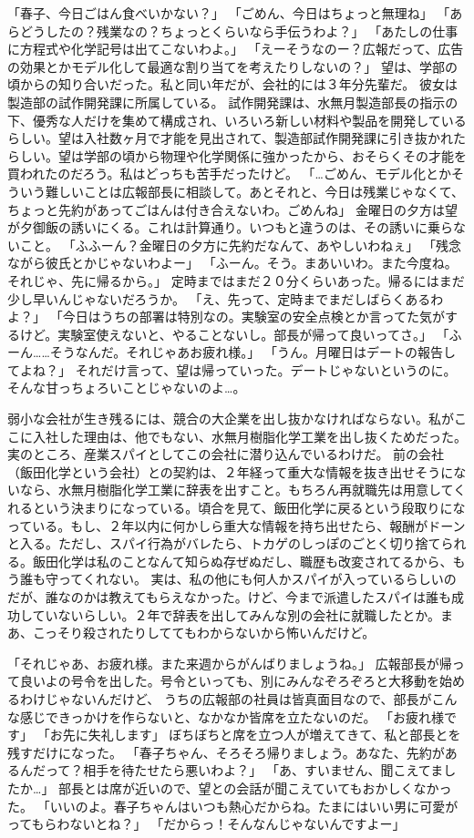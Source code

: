 「春子、今日ごはん食べいかない？」
「ごめん、今日はちょっと無理ね」
「あらどうしたの？残業なの？ちょっとくらいなら手伝うわよ？」
「あたしの仕事に方程式や化学記号は出てこないわよ。」
「えーそうなのー？広報だって、広告の効果とかモデル化して最適な割り当てを考えたりしないの？」
望は、学部の頃からの知り合いだった。私と同い年だが、会社的には３年分先輩だ。
彼女は製造部の試作開発課に所属している。
試作開発課は、水無月製造部長の指示の下、優秀な人だけを集めて構成され、いろいろ新しい材料や製品を開発しているらしい。望は入社数ヶ月で才能を見出されて、製造部試作開発課に引き抜かれたらしい。望は学部の頃から物理や化学関係に強かったから、おそらくその才能を買われたのだろう。私はどっちも苦手だったけど。
「…ごめん、モデル化とかそういう難しいことは広報部長に相談して。あとそれと、今日は残業じゃなくて、ちょっと先約があってごはんは付き合えないわ。ごめんね」
金曜日の夕方は望が夕御飯の誘いにくる。これは計算通り。いつもと違うのは、その誘いに乗らないこと。
「ふふーん？金曜日の夕方に先約だなんて、あやしいわねぇ」
「残念ながら彼氏とかじゃないわよー」
「ふーん。そう。まあいいわ。また今度ね。それじゃ、先に帰るから。」
定時まではまだ２０分くらいあった。帰るにはまだ少し早いんじゃないだろうか。
「え、先って、定時までまだしばらくあるわよ？」
「今日はうちの部署は特別なの。実験室の安全点検とか言ってた気がするけど。実験室使えないと、やることないし。部長が帰って良いってさ。」
「ふーん……そうなんだ。それじゃあお疲れ様。」
「うん。月曜日はデートの報告してよね？」
それだけ言って、望は帰っていった。デートじゃないというのに。そんな甘っちょろいことじゃないのよ…。

弱小な会社が生き残るには、競合の大企業を出し抜かなければならない。私がここに入社した理由は、他でもない、水無月樹脂化学工業を出し抜くためだった。実のところ、産業スパイとしてこの会社に潜り込んでいるわけだ。
前の会社（飯田化学という会社）との契約は、２年経って重大な情報を抜き出せそうにないなら、水無月樹脂化学工業に辞表を出すこと。もちろん再就職先は用意してくれるという決まりになっている。頃合を見て、飯田化学に戻るという段取りになっている。もし、２年以内に何かしら重大な情報を持ち出せたら、報酬がドーンと入る。ただし、スパイ行為がバレたら、トカゲのしっぽのごとく切り捨てられる。飯田化学は私のことなんて知らぬ存ぜぬだし、職歴も改変されてるから、もう誰も守ってくれない。
実は、私の他にも何人かスパイが入っているらしいのだが、誰なのかは教えてもらえなかった。けど、今まで派遣したスパイは誰も成功していないらしい。２年で辞表を出してみんな別の会社に就職したとか。まあ、こっそり殺されたりしててもわからないから怖いんだけど。

「それじゃあ、お疲れ様。また来週からがんばりましょうね。」
広報部長が帰って良いよの号令を出した。号令といっても、別にみんなぞろぞろと大移動を始めるわけじゃないんだけど、
うちの広報部の社員は皆真面目なので、部長がこんな感じできっかけを作らないと、なかなか皆席を立たないのだ。
「お疲れ様です」
「お先に失礼します」
ぼちぼちと席を立つ人が増えてきて、私と部長とを残すだけになった。
「春子ちゃん、そろそろ帰りましょう。あなた、先約があるんだって？相手を待たせたら悪いわよ？」
「あ、すいません、聞こえてましたか…」
部長とは席が近いので、望との会話が聞こえていてもおかしくなかった。
「いいのよ。春子ちゃんはいつも熱心だからね。たまにはいい男に可愛がってもらわないとね？」
「だからっ！そんなんじゃないんですよー」


